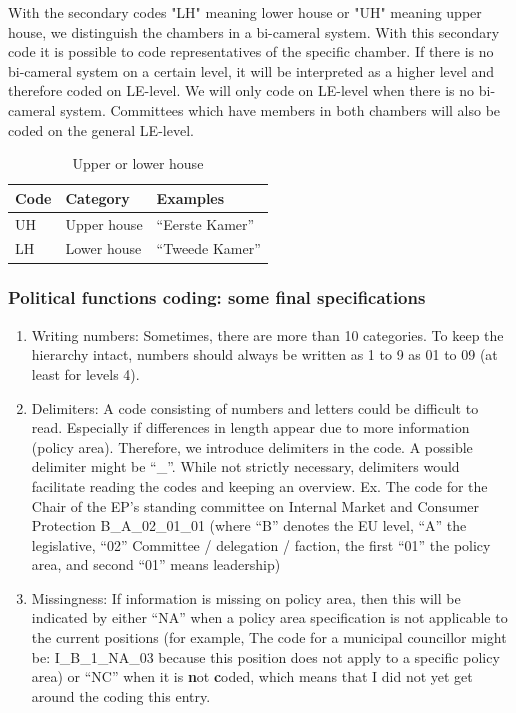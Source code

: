 \documentclass{article}
\begin{document}
With the secondary codes "LH" meaning lower house or "UH" meaning upper house, we distinguish the chambers in a bi-cameral system. With this secondary code it is possible to code representatives of the specific chamber. If there is no bi-cameral system on a certain level, it will be interpreted as a higher level and therefore coded on LE-level. We will only code on LE-level when there is no bi-cameral system. Committees which have members in both chambers will also be coded on the general LE-level. 

    \begin{table}[H]
    \begin{center}
         \begin{tabular}{|l|l|l|}
        Code & Category &  Examples \\
        \hline
        UH   & Upper house & ``Eerste Kamer” \\
        LH   & Lower house & ``Tweede Kamer” \\
        \hline
        \end{tabular}\caption{Upper or lower house}
    \end{center}
    \end{table}

\subsubsection{Political functions coding: some final specifications}
    \begin{enumerate}
    \setlength\itemsep{0em}   
        \item Writing numbers: Sometimes, there are more than 10 categories. To keep the hierarchy intact, numbers should always be written as 1 to 9 as 01 to 09 (at least for levels 4). 
        \item Delimiters: A code consisting of numbers and letters could be difficult to read. Especially if differences in length appear due to more information (policy area). Therefore, we introduce delimiters in the code. A possible delimiter might be ``\_”. While not strictly necessary, delimiters would facilitate reading the codes and keeping an overview.
        Ex. The code for the Chair of the EP's standing committee on Internal Market and Consumer Protection
        B\_A\_02\_01\_01 (where ``B'' denotes the EU level, ``A” the legislative, ``02” Committee / delegation / faction, the first ``01” the policy area, and second ``01” means leadership)
        \item Missingness: If information is missing on policy area, then this will be indicated by either ``NA” when a policy area specification is not applicable to the current positions (for example, The code for a municipal councillor might be: I\_B\_1\_NA\_03 because this position does not apply to a specific policy area) or ``NC'' when it is \textbf{n}ot \textbf{c}oded, which means that I did not yet get around the coding this entry.
    \end{enumerate}
\end{document}
